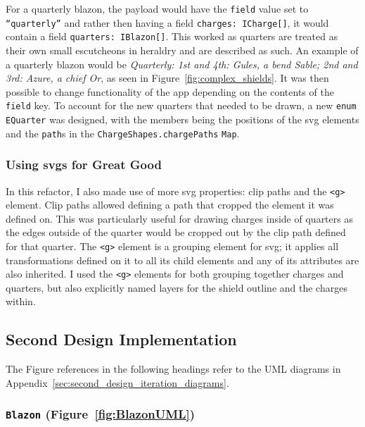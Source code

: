 \documentclass[nobib, a4paper, twoside, justified]{tufte-book}
\makeatletter
\newcommand{\svg}{\gls{svg}\@\xspace}
\newcommand{\svgs}{\glspl{svg}\@\xspace}
\newcommand{\charges}{\glspl{charge}\@\xspace}
\newcommand{\quarter}{\gls{quarter}\@\xspace}
\newcommand{\quarters}{\glspl{quarter}\@\xspace}
\newcommand{\blazon}{\gls{blazon}\@\xspace}
\newcommand{\payload}{\gls{payload}\@\xspace}
\makeatother
\begin{document}
For a quarterly \blazon, the \payload would have the \texttt{\gls{field}} value set to
\texttt{``quarterly''} and rather then having a field \texttt{charges: ICharge[]}, it would contain
a field \texttt{quarters: IBlazon[]}. This worked as \quarters are treated as their own small
\glspl{escutcheon} in heraldry and are described as such. An example of a quarterly \blazon would
be \textit{Quarterly: 1st and 4th: Gules, a bend Sable; 2nd and 3rd: Azure, a chief Or}, as seen in
Figure~\ref{fig:complex_shields}. It was then possible to change functionality of the app depending
on the contents of the \texttt{field} key. To account for the new quarters that needed to be drawn,
a new \texttt{enum} \texttt{EQuarter} was designed, with the members being the positions of the
\svg elements and the \texttt{path}s in the \texttt{ChargeShapes.chargePaths} \texttt{Map}.

\subsubsection{Using \svgs for Great Good}%
\label{ssub:using_svg_for_great_good}

In this refactor, I also made use of more \svg properties: clip paths and the \texttt{<g>} element.
Clip paths allowed defining a path that cropped the element it was defined on. This was
particularly useful for drawing \charges inside of \quarters as the edges outside of the \quarter
would be cropped out by the clip path defined for that \quarter. The \texttt{<g>} element is a
grouping element for \svg; it applies all transformations defined on it to all its child elements
and any of its attributes are also inherited. I used the \texttt{<g>} elements for both grouping
together charges and quarters, but also explicitly named layers for the shield outline and the
\charges within.

\subsection{Second Design Implementation}%
\label{sub:second_design_implementation}

The Figure references in the following headings refer to the UML diagrams in
Appendix~\ref{sec:second_design_iteration_diagrams}.

\subsubsection{\texttt{Blazon} (Figure~\ref{fig:BlazonUML})}%
\label{ssub:blazon}
\end{document}
